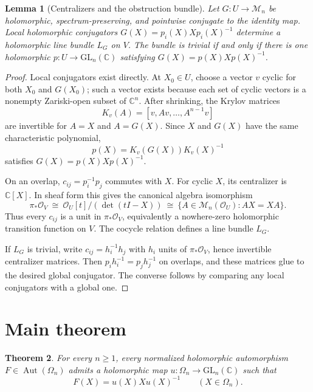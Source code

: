 \documentclass[11pt]{article}
\newtheorem{theorem}{Theorem}
\newtheorem{lemma}[theorem]{Lemma}
\newcommand{\Om}{\Omega_n}
\newcommand{\M}{\mathcal M_n}
\newcommand{\OO}{\mathcal O}
\newcommand{\C}{\mathbb C}
\newcommand{\GL}{\mathrm{GL}_n(\C)}
\newcommand{\Aut}{\operatorname{Aut}}
\begin{document}
\begin{lemma}[Centralizers and the obstruction bundle]\label{lem:bundle}
Let $G:U\to\M$ be holomorphic, spectrum-preserving, and pointwise conjugate to
the identity map.  Local holomorphic conjugators
$G(X)=p_i(X)Xp_i(X)^{-1}$ determine a holomorphic line bundle $L_G$ on $V$.
The bundle is trivial if and only if there is one holomorphic
$p:U\to\GL$ satisfying $G(X)=p(X)Xp(X)^{-1}$.
\end{lemma}

\begin{proof}
Local conjugators exist directly.  At $X_0\in U$, choose a vector $v$ cyclic
for both $X_0$ and $G(X_0)$; such a vector exists because each set of cyclic
vectors is a nonempty Zariski-open subset of $\C^n$.  After shrinking, the
Krylov matrices
\[
 K_v(A)=[v,Av,\ldots,A^{n-1}v]
\]
are invertible for $A=X$ and $A=G(X)$.  Since $X$ and $G(X)$ have the same
characteristic polynomial,
\[
 p(X)=K_v(G(X))K_v(X)^{-1}
\]
satisfies $G(X)=p(X)Xp(X)^{-1}$.

On an overlap, $c_{ij}=p_i^{-1}p_j$ commutes with $X$.  For cyclic $X$, its
centralizer is $\C[X]$.  In sheaf form this gives the canonical algebra
isomorphism
\[
 \pi_*\OO_V\ \cong\
 \OO_U[t]/(\det(tI-X))\ \cong\
 \{A\in\M(\OO_U):AX=XA\}.
\]
Thus every $c_{ij}$ is a unit in $\pi_*\OO_V$, equivalently a nowhere-zero
holomorphic transition function on $V$.  The cocycle relation defines a line
bundle $L_G$.

If $L_G$ is trivial, write $c_{ij}=h_i^{-1}h_j$ with $h_i$ units of
$\pi_*\OO_V$, hence invertible centralizer matrices.  Then
$p_i h_i^{-1}=p_jh_j^{-1}$ on overlaps, and these matrices glue to the desired
global conjugator.  The converse follows by comparing any local conjugators
with a global one.
\end{proof}

\section{Main theorem}
\begin{theorem}\label{thm:main}
For every $n\ge1$, every normalized holomorphic automorphism
$F\in\Aut(\Om)$ admits a holomorphic map $u:\Om\to\GL$ such that
\[
 F(X)=u(X)Xu(X)^{-1}\qquad(X\in\Om).
\]
\end{theorem}
\end{document}
